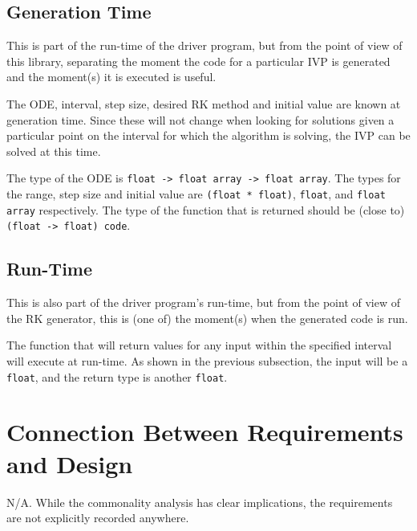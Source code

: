 \documentclass[12pt, titlepage]{article}
\begin{document}
\subsection{Generation Time}
This is part of the run-time of the driver program, but from the point of view 
of this library, separating the moment the code for a particular IVP is 
generated and the moment(s) it is executed is useful.

The ODE, interval, step size, desired RK method and initial value are known at 
generation time. 
Since these will not change when looking for solutions given a particular point 
on the interval for which the algorithm is solving, the IVP can be solved at 
this time.

The type of the ODE is \lstinline|float -> float array -> float array|. The 
types for the range, step size and initial value are 
\lstinline|(float * float)|, \lstinline|float|, and \lstinline|float array| 
respectively.
The type of the function that is returned should be (close to) 
\lstinline|(float -> float) code|.

\subsection{Run-Time}
This is also part of the driver program's run-time, but from the point of view 
of the RK generator, this is (one of) the moment(s) when the generated code is 
run.

The function that will return values for any input within the specified 
interval will execute at run-time.
As shown in the previous subsection, the input will be a \lstinline|float|, and 
the return type is another \lstinline|float|.



\section{Connection Between Requirements and Design} \label{SecConnection}

N/A. While the commonality analysis has clear implications, the requirements 
are not explicitly recorded anywhere. 
\end{document}
